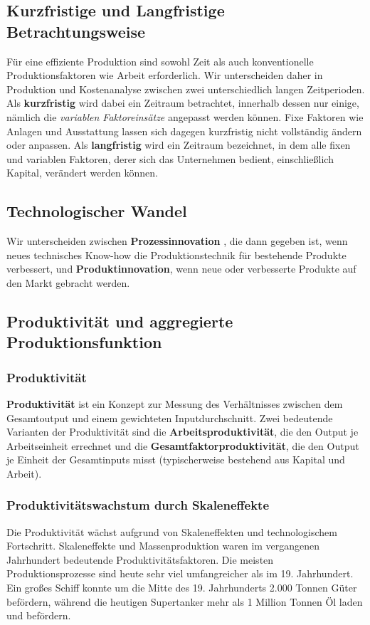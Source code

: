 \documentclass[10pt]{scrartcl}
\begin{document}
\subsection{Kurzfristige und Langfristige Betrachtungsweise}
Für eine effiziente Produktion sind sowohl Zeit als auch konventionelle Produktionsfaktoren wie Arbeit erforderlich. Wir unterscheiden daher in Produktion und Kostenanalyse zwischen zwei unterschiedlich langen Zeitperioden. Als {\bf kurzfristig} wird dabei ein Zeitraum betrachtet, innerhalb dessen nur einige, nämlich die {\it variablen Faktoreinsätze} angepasst werden können. Fixe Faktoren wie Anlagen und Ausstattung lassen sich dagegen kurzfristig nicht vollständig ändern oder anpassen. Als  {\bf langfristig} wird ein Zeitraum bezeichnet, in dem alle fixen und variablen Faktoren, derer sich das Unternehmen bedient, einschließlich Kapital, verändert werden können.

\subsection{Technologischer Wandel}
Wir unterscheiden zwischen {\bf Prozessinnovation} , die dann gegeben ist, wenn neues technisches Know-how die Produktionstechnik für bestehende Produkte verbessert, und {\bf Produktinnovation}, wenn neue oder verbesserte Produkte auf den Markt gebracht werden.  

\subsection{Produktivität und aggregierte Produktionsfunktion}
\subsubsection{Produktivität}
{\bf Produktivität} ist ein Konzept zur Messung des Verhältnisses zwischen dem Gesamtoutput und einem gewichteten Inputdurchschnitt. Zwei bedeutende Varianten der Produktivität sind die {\bf Arbeitsproduktivität}, die den Output je Arbeitseinheit errechnet und die {\bf Gesamtfaktorproduktivität}, die den Output je Einheit der Gesamtinputs misst (typischerweise bestehend aus Kapital und Arbeit).
\subsubsection{Produktivitätswachstum durch Skaleneffekte}
Die Produktivität wächst aufgrund von Skaleneffekten und technologischem Fortschritt. Skaleneffekte und Massenproduktion waren im vergangenen Jahrhundert bedeutende Produktivitätsfaktoren. Die meisten Produktionsprozesse sind heute sehr viel umfangreicher als im 19. Jahrhundert. Ein großes Schiff konnte um die Mitte des 19. Jahrhunderts 2.000 Tonnen Güter befördern, während die heutigen Supertanker mehr als 1 Million Tonnen Öl laden und befördern. 
\end{document}
